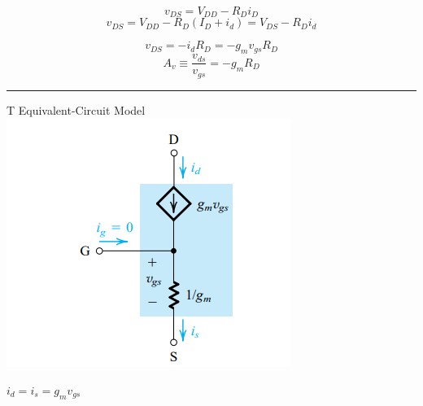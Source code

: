 \documentclass[a4paper]{article}
\begin{document}
\begin{multicols}{3}
$$v_{DS} = V_{DD} - R_D i_D$$
$$v_{DS} = V_{DD} - R_D(I_D + i_d) = V_{DS} - R_D i_d$$

$$v_{DS} = -i_d R_D = -g_m v_{gs} R_D$$
$$A_v \equiv \frac{v_{ds}}{v_{gs}} = -g_m R_D$$

\hrule
\vspace{1mm}
T Equivalent-Circuit Model
\includegraphics[width=\linewidth]{imgs/t_circuit.png}

$i_d=i_s=g_m v_{gs}$
\end{multicols}
\pagebreak
\end{document}
